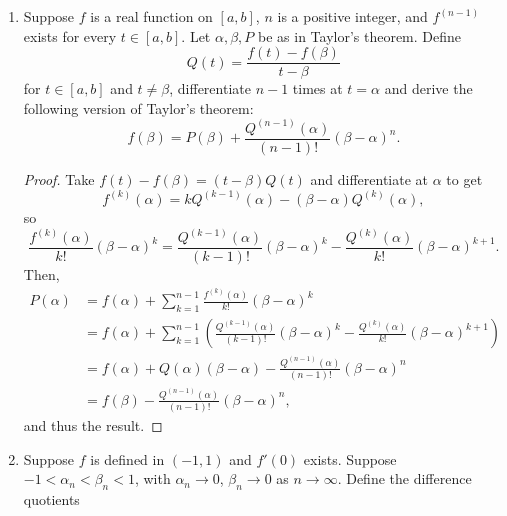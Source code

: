 \begin{enumerate}[1.]
    \begin{proof}
        Applying Taylor's theorem, we have
        \[
            f(1) = f(0) + f'(0) \cdot 1 + \frac{1}{2} f''(0) \cdot 1^2 + \frac{1}{6} f^{(3)}(t) \cdot 1^3
        \]
        for some $t \in (0, 1)$ and 
        \[
            f(-1) = f(0) + f'(0) \cdot (-1) + \frac{1}{2} f''(0) \cdot (-1)^2 + \frac{1}{6} f^{(3)}(s) \cdot (-1)^3
        \]
        for some $s \in (-1, 0)$ so adding these, substituting known values, and rearranging yields $f^{(3)}(s) + f^{(3)}(t) = 6$ for some $s, t$, yielding the result.
    \end{proof}
\item %
    Suppose $f$ is a real function on $[a, b]$, $n$ is a positive integer, and $f^{(n-1)}$ exists for every $t \in [a, b]$. Let $\alpha, \beta, P$ be as in Taylor's theorem. Define
    \[
        Q(t) = \frac{f(t) - f(\beta)}{t - \beta}
    \]
    for $t \in [a, b]$ and $t \ne \beta$, differentiate $n - 1$ times at $t = \alpha$ and derive the following version of Taylor's theorem:
    \[
        f(\beta) = P(\beta) + \frac{Q^{(n-1)}(\alpha)}{(n-1)!} (\beta - \alpha)^n.
    \]
    \begin{proof}
        Take $f(t) - f(\beta) = (t - \beta)Q(t)$ and differentiate at $\alpha$ to get
        \[
            f^{(k)}(\alpha) = kQ^{(k-1)} (\alpha) - (\beta - \alpha) Q^{(k)}(\alpha),
        \]
        so
        \[
            \frac{f^{(k)}(\alpha)}{k!} (\beta - \alpha)^k = \frac{Q^{(k-1)}(\alpha)}{(k-1)!}(\beta - \alpha)^k - \frac{Q^{(k)} (\alpha)} {k!} (\beta - \alpha)^{k+1}.
        \]
        Then,
        \begin{align*}
            P(\alpha) &= f(\alpha) + \sum_{k=1}^{n-1} \frac{f^{(k)} (\alpha)}{k!} (\beta - \alpha)^k \\
                &= f(\alpha) + \sum_{k=1}^{n-1} \left(\frac{Q^{(k-1)}(\alpha)}{(k-1)!}(\beta - \alpha)^k - \frac{Q^{(k)} (\alpha)} {k!} (\beta - \alpha)^{k+1} \right) \\
                &= f(\alpha) + Q(\alpha) (\beta - \alpha) - \frac{Q^{(n-1)} (\alpha)} {(n-1)!} (\beta - \alpha)^{n} \\
                &= f(\beta) - \frac{Q^{(n-1)}(\alpha)}{(n-1)!} (\beta - \alpha)^n,
        \end{align*}
        and thus the result.
    \end{proof}
\item %
    Suppose $f$ is defined in $(-1, 1)$ and $f'(0)$ exists. Suppose $-1 < \alpha_n < \beta_n < 1$, with $\alpha_n \to 0$, $\beta_n \to 0$ as $n \to \infty$. Define the difference quotients

\end{enumerate}
